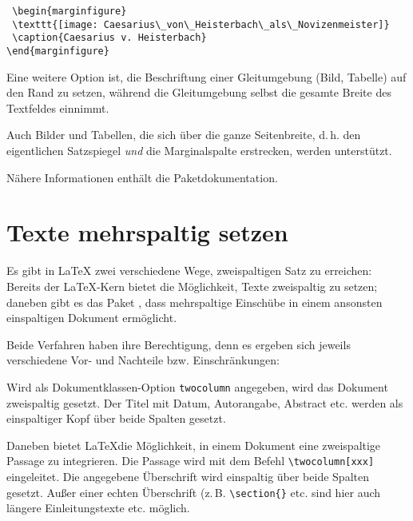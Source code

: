 \begin{lstlisting}
 \begin{marginfigure}
 \texttt{[image: Caesarius\_von\_Heisterbach\_als\_Novizenmeister]}
 \caption{Caesarius v. Heisterbach}
\end{marginfigure}
\end{lstlisting}


Eine weitere Option ist, die Beschriftung einer Gleitumgebung (Bild, Tabelle) auf den Rand zu
setzen, während die Gleitumgebung selbst die gesamte Breite des Textfeldes einnimmt.

Auch Bilder und Tabellen, die sich über die ganze Seitenbreite, d.\,h. den eigentlichen Satzspiegel
\emph{und} die Marginalspalte erstrecken, werden unterstützt.

Nähere Informationen enthält die Paketdokumentation.


\section{Texte mehrspaltig setzen}

Es gibt in \LaTeX{} zwei verschiedene Wege, zweispaltigen Satz zu erreichen:
Bereits der \LaTeX -Kern bietet die Möglichkeit, Texte zweispaltig zu setzen;
daneben gibt es das Paket , dass mehrspaltige Einschübe in einem ansonsten
einspaltigen Dokument ermöglicht.

Beide Verfahren haben ihre Berechtigung, denn es ergeben sich jeweils verschiedene
Vor- und Nachteile bzw. Einschränkungen:


Wird als Dokumentklassen-Option \lstinline/twocolumn/ angegeben, wird das Dokument 
zweispaltig gesetzt. 
Der Titel mit Datum, Autorangabe, Abstract etc. werden als einspaltiger Kopf über beide 
Spalten gesetzt.



Daneben bietet \LaTeX die Möglichkeit, in einem Dokument eine zweispaltige Passage
zu integrieren. Die Passage wird mit dem Befehl \lstinline/\twocolumn[xxx] /
eingeleitet. Die angegebene Überschrift wird einspaltig über beide Spalten gesetzt.
Außer einer echten Überschrift (z.\,B. \lstinline/\section{}/ etc. sind hier auch
längere Einleitungstexte etc. möglich.

